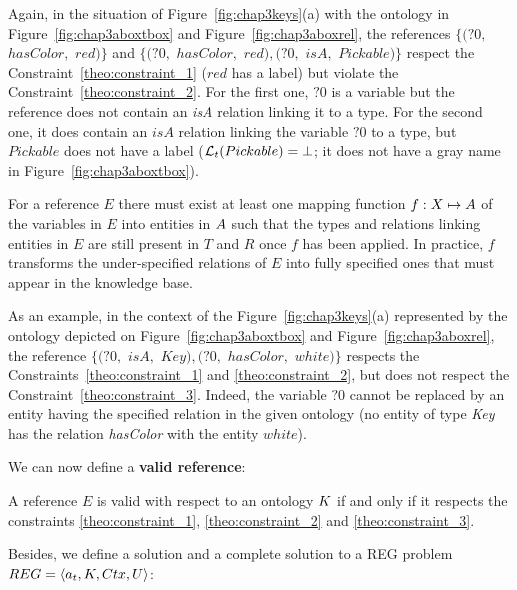 \documentclass[a4paper,11pt,twoside]{StyleThese}
\begin{document}
Again, in the situation of Figure~\ref{fig:chap3keys}(a) with the ontology in Figure~\ref{fig:chap3aboxtbox} and Figure~\ref{fig:chap3aboxrel}, the references $\{(?0,$ $hasColor,$ $red)\}$ and $\{(?0,$ $hasColor,$ $red), (?0,$ $isA,$ $Pickable)\}$ respect the Constraint~\ref{theo:constraint_1} ($red$ has a label) but violate the Constraint~\ref{theo:constraint_2}. For the first one, $?0$ is a variable but the reference does not contain an \textit{isA} relation linking it to a type. For the second one, it does contain an $isA$ relation linking the variable $?0$ to a type, but $Pickable$ does not have a label ($\mathcal{L}_t(Pickable) = \bot$; it does not have a gray name in Figure~\ref{fig:chap3aboxtbox}).

\begin{constraint}
\label{theo:constraint_3}
For a reference $E$ there must exist at least one mapping function $f: X \mapsto A$ of the variables in $E$ into entities in $A$ such that the types and relations linking entities in $E$ are still present in $T$ and $R$ once $f$ has been applied.
In practice, $f$ transforms the under-specified relations of $E$ into fully specified ones that must appear in the knowledge base.
\end{constraint}

As an example, in the context of the Figure~\ref{fig:chap3keys}(a) represented by the ontology depicted on Figure~\ref{fig:chap3aboxtbox} and Figure~\ref{fig:chap3aboxrel}, the reference $\{(?0,$ $isA,$ $Key), (?0,$ $hasColor,$ $white)\}$ respects the Constraints~\ref{theo:constraint_1} and \ref{theo:constraint_2}, but does not respect the Constraint~\ref{theo:constraint_3}. Indeed, the variable $?0$ cannot be replaced by an entity having the specified relation in the given ontology (no entity of type \textit{Key} has the relation \textit{hasColor} with the entity $white$).

We can now define a \textbf{valid reference}:

\begin{definition}
\label{theo:valid_ref}
A reference $E$ is valid with respect to an ontology $K$ if and only if it respects the constraints \ref{theo:constraint_1}, \ref{theo:constraint_2} and \ref{theo:constraint_3}.
\end{definition}

Besides, we define a solution and a complete solution to a REG problem $REG = \langle a_t, K, Ctx, U \rangle$:
\end{document}
